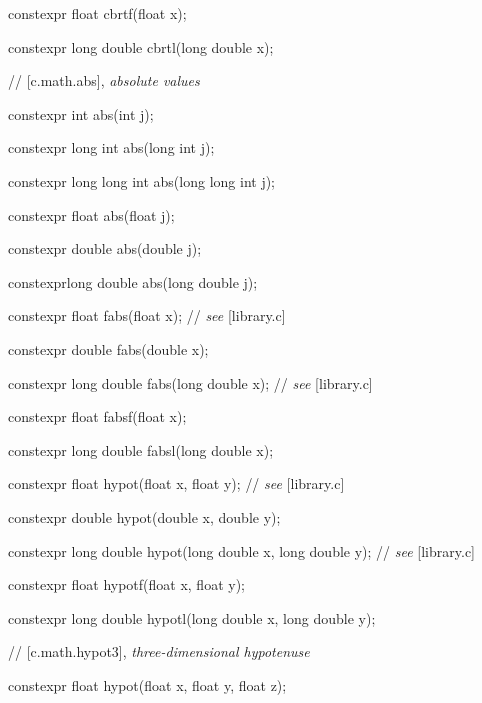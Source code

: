 \documentclass[prd,twocolumn,amsmath,amssymb,nofootinbib,eqsecnum]{revtex4-1}
\newcommand{\highlight}[1]{{\color{red} #1}}
\newcommand{\oldhighlight}[1]{{\color{green} #1}}
\newcommand{\stdcomment}[1]{{// {\it see} [#1]}}
\begin{document}
{\highlight{constexpr} float cbrtf(float x);

\highlight{constexpr} long double cbrtl(long double x);

\vspace{2ex}

//  [c.math.abs], {\it absolute values}


\oldhighlight{constexpr} int abs(int j);

\oldhighlight{constexpr} long int abs(long int j);

\oldhighlight{constexpr} long long int abs(long long int j);

\oldhighlight{constexpr} float abs(float j);

\oldhighlight{constexpr} double abs(double j);

\oldhighlight{constexpr}long double abs(long double j);

\vspace{2ex}


\oldhighlight{constexpr} float fabs(float x); \stdcomment{library.c}

\oldhighlight{constexpr} double fabs(double x);

\oldhighlight{constexpr} long double fabs(long double x); \stdcomment{library.c}

\oldhighlight{constexpr} float fabsf(float x);

\oldhighlight{constexpr} long double fabsl(long double x);

\vspace{2ex}


\highlight{constexpr} float hypot(float x, float y); \stdcomment{library.c}

\highlight{constexpr} double hypot(double x, double y);

\highlight{constexpr} long double hypot(long double x, long double y); \stdcomment{library.c}

\highlight{constexpr} float hypotf(float x, float y);

\highlight{constexpr} long double hypotl(long double x, long double y);

\vspace{2ex}

// [c.math.hypot3], {\it three-dimensional hypotenuse}


\highlight{constexpr} float hypot(float x, float y, float z);

}
\end{document}
